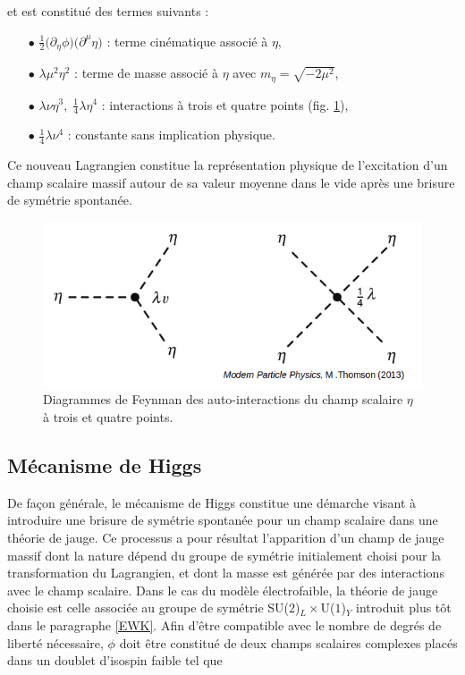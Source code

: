         et est constitué des termes suivants :

        \begin{enumerate}
            \item[$\bullet$] $\frac{1}{2}\bigl(\partial_{\eta}\phi\bigr)\bigl(\partial^{\mu}\eta\bigr)$ : terme cinématique associé à $\eta$,
            \item[$\bullet$] $\lambda\mu^2\eta^2$ : terme de masse associé à $\eta$ avec $m_{\eta}=\sqrt{-2\mu^2}$,
            \item[$\bullet$] $\lambda\nu\eta^3,\;\frac{1}{4}\lambda\eta^4$ : interactions à trois et quatre points (fig. \ref{higgsVtx}),
            \item[$\bullet$] $\frac{1}{4}\lambda\nu^4$ : constante sans implication physique.
        \end{enumerate}

        Ce nouveau Lagrangien constitue la représentation physique de l'excitation d'un champ scalaire massif autour de sa valeur moyenne dans le vide après une brisure de symétrie spontanée.

        \begin{figure}
        \centering
            \includegraphics[scale=0.45]{Chapitre2/Images/higgsVtx.png} 
            \caption{Diagrammes de Feynman des auto-interactions du champ scalaire $\eta$ à trois et quatre points.}
        \label{higgsVtx}
        \end{figure}

        \subsection{Mécanisme de Higgs}
        \label{higgsmeca}

        De façon générale, le mécanisme de Higgs constitue une démarche visant à introduire une brisure de symétrie spontanée pour un champ scalaire dans une théorie de jauge. Ce processus a pour résultat l'apparition d'un champ de jauge massif dont la nature dépend du groupe de symétrie initialement choisi pour la transformation du Lagrangien, et dont la masse est générée par des interactions avec le champ scalaire. Dans le cas du modèle électrofaible, la théorie de jauge choisie est celle associée au groupe de symétrie SU($2$)$_L\times$U($1$)$_Y$ introduit plus tôt dans le paragraphe \ref{EWK}. Afin d'être compatible avec le nombre de degrés de liberté nécessaire, $\phi$ doit être constitué de deux champs scalaires complexes placés dans un doublet d'isospin faible tel que 

